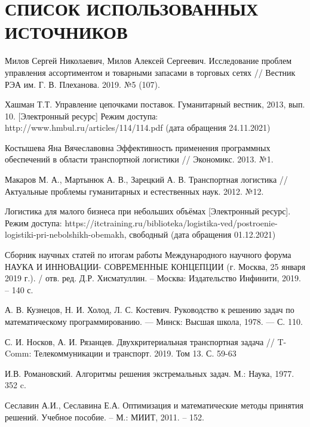 \section*{СПИСОК ИСПОЛЬЗОВАННЫХ ИСТОЧНИКОВ}

\begingroup
\renewcommand{\section}[2]{}
\begin{thebibliography}{}
	 Милов Сергей Николаевич, Милов Алексей Сергеевич. Исследование проблем управления ассортиментом и товарными запасами в торговых сетях // Вестник РЭА им. Г. В. Плеханова. 2019. №5 (107).
	
	 Хашман Т.Т. Управление цепочками поставок. Гуманитарный вестник,
	2013, вып. 10. [Электронный ресурс] Режим доступа: http://www.hmbul.ru/articles/114/114.pdf (дата обращения 24.11.2021)
	
	 Костышева Яна Вячеславовна Эффективность применения программных обеспечений в области транспортной логистики // Экономикс. 2013. №1.
	
	 Макаров М. А., Мартынюк А. В., Зарецкий А. В. Транспортная логистика // Актуальные проблемы гуманитарных и естественных наук. 2012. №12.
	
	 Логистика для малого бизнеса при небольших объёмах [Электронный ресурс]. Режим доступа: https://itctraining.ru/biblioteka/logistika-ved/postroenie-logistiki-pri-nebolshikh-obemakh, свободный (дата обращения 01.12.2021)
	
	 Сборник научных статей по итогам работы Международного
	научного форума НАУКА И ИННОВАЦИИ- СОВРЕМЕННЫЕ
	КОНЦЕПЦИИ (г. Москва, 25 января 2019 г.). / отв. ред. Д.Р.
	Хисматуллин. – Москва: Издательство Инфинити, 2019. – 140 с.
	
	 А. В. Кузнецов, Н. И. Холод, Л. С. Костевич. Руководство к решению задач по математическому программированию. — Минск: Высшая школа, 1978. — С. 110.
	
	 С. И. Носков, А. И. Рязанцев. Двухкритериальная транспортная задача // T-Comm: Телекоммуникации и транспорт. 2019. Том 13. С. 59-63
	
	 И.В. Романовский. Алгоритмы решения экстремальных задач. М.: Наука, 1977. 352 c.
	
	 Сеславин А.И., Сеславина Е.А. Оптимизация и
	математические методы принятия решений. Учебное
	пособие. – М.: МИИТ, 2011. – 152. 
\end{thebibliography}
\endgroup

\pagebreak
